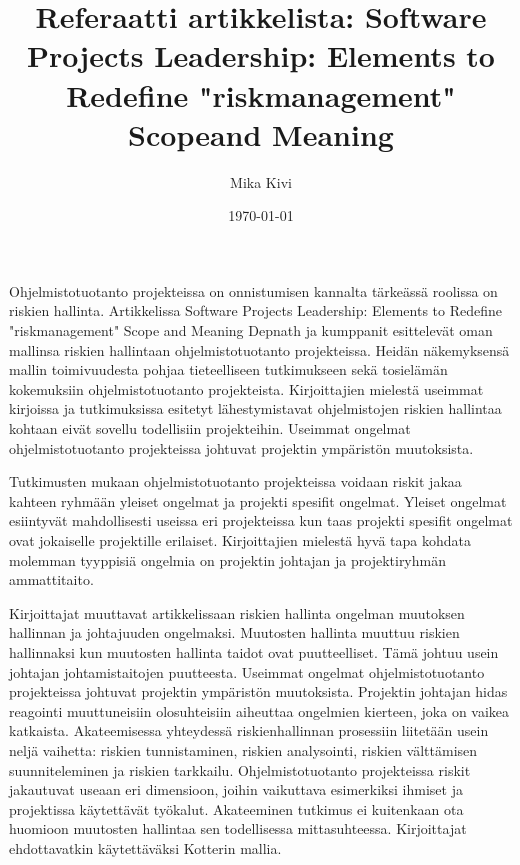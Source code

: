 \documentclass[finnish]{tktltiki2}
\title{Referaatti artikkelista: Software Projects Leadership: Elements to Redefine "riskmanagement" Scopeand Meaning}
\author{Mika Kivi}
\date{\today}
\theoremstyle{definition}
\theoremstyle{remark}
\begin{document}

\maketitle        %






Ohjelmistotuotanto projekteissa on onnistumisen kannalta tärkeässä roolissa on riskien hallinta. Artikkelissa Software Projects Leadership: Elements to Redefine "riskmanagement" Scope and Meaning Depnath ja kumppanit esittelevät oman mallinsa riskien hallintaan ohjelmistotuotanto projekteissa. Heidän näkemyksensä mallin toimivuudesta pohjaa tieteelliseen tutkimukseen sekä tosielämän kokemuksiin ohjelmistotuotanto projekteista. Kirjoittajien mielestä useimmat kirjoissa ja tutkimuksissa esitetyt lähestymistavat ohjelmistojen riskien hallintaa kohtaan eivät sovellu todellisiin projekteihin. Useimmat ongelmat ohjelmistotuotanto projekteissa johtuvat projektin ympäristön muutoksista. 

Tutkimusten mukaan ohjelmistotuotanto projekteissa voidaan riskit jakaa kahteen ryhmään yleiset ongelmat ja projekti spesifit ongelmat. Yleiset ongelmat esiintyvät mahdollisesti useissa eri projekteissa kun taas projekti spesifit ongelmat ovat jokaiselle projektille erilaiset. Kirjoittajien mielestä hyvä tapa kohdata molemman tyyppisiä ongelmia on projektin johtajan ja projektiryhmän ammattitaito.  
 
Kirjoittajat muuttavat artikkelissaan riskien hallinta ongelman muutoksen hallinnan ja johtajuuden ongelmaksi. Muutosten hallinta muuttuu riskien hallinnaksi kun muutosten hallinta taidot ovat puutteelliset. Tämä johtuu usein johtajan johtamistaitojen puutteesta. Useimmat ongelmat ohjelmistotuotanto projekteissa johtuvat projektin ympäristön muutoksista.  Projektin johtajan hidas reagointi muuttuneisiin olosuhteisiin aiheuttaa ongelmien kierteen, joka on vaikea katkaista.
Akateemisessa yhteydessä riskienhallinnan prosessiin liitetään usein neljä vaihetta: riskien tunnistaminen, riskien analysointi, riskien välttämisen suunniteleminen ja riskien tarkkailu. Ohjelmistotuotanto projekteissa riskit jakautuvat useaan eri dimensioon, joihin vaikuttava esimerkiksi ihmiset ja projektissa käytettävät työkalut. Akateeminen tutkimus ei kuitenkaan ota huomioon muutosten hallintaa sen todellisessa mittasuhteessa. Kirjoittajat ehdottavatkin käytettäväksi Kotterin mallia.
 
\end{document}
